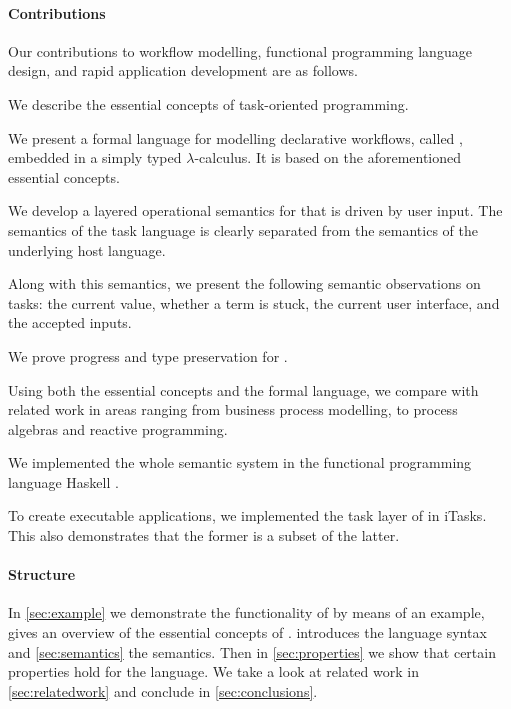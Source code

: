 \paragraph{Contributions}

Our contributions to workflow modelling, functional programming language design, and rapid application development are as follows.


\begin{enumerate*}
  \item
    We describe the essential concepts of task-oriented programming.
  \item
    We present a formal language for modelling declarative workflows, called \TOPHAT, embedded in a simply typed $\lambda$-calculus.
    It is based on the aforementioned essential \TOP concepts.
  \item
    We develop a layered operational semantics for \TOPHAT that is driven by user input.
    The semantics of the task language is clearly separated from the semantics of the underlying host language.
  \item
    Along with this semantics, we present the following semantic observations on tasks:
    the current value, whether a term is stuck, the current user interface, and the accepted inputs.
  \item
    We prove progress and type preservation for \TOPHAT.
  \item
    Using both the essential concepts and the formal language, we compare \TOP with related work in areas ranging from business process modelling, to process algebras and reactive programming.
  \item
    We implemented the whole semantic system in the functional programming language Haskell \cite{marlow2010haskell}.
  \item
    To create executable applications, we implemented the task layer of \TOPHAT in iTasks.
    This also demonstrates that the former is a subset of the latter.
\end{enumerate*}


\paragraph{Structure}

In \cref{sec:example} we demonstrate the functionality of \TOPHAT by means of an example,
 gives an overview of the essential concepts of \TOP.
 introduces the \TOPHAT language syntax
and \cref{sec:semantics} the semantics.
Then in \cref{sec:properties} we show that certain properties hold for the language.
We take a look at related work in \cref{sec:relatedwork}
and conclude in \cref{sec:conclusions}.
